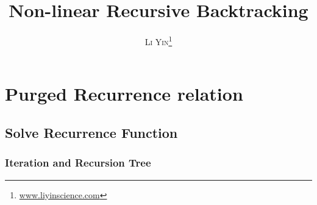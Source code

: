 \documentclass[a4paper,11pt]{book}
\title{\Huge \textbf{Non-linear Recursive Backtracking}   }
\author{\textsc{Li Yin}\thanks{\url{www.liyinscience.com}}}
\begin{document}
\frontmatter
\maketitle

% 
% 

% 

% 
\chapter{Purged Recurrence relation}
\section{Solve Recurrence Function}


\subsection{Iteration and Recursion Tree} 
\end{document}
